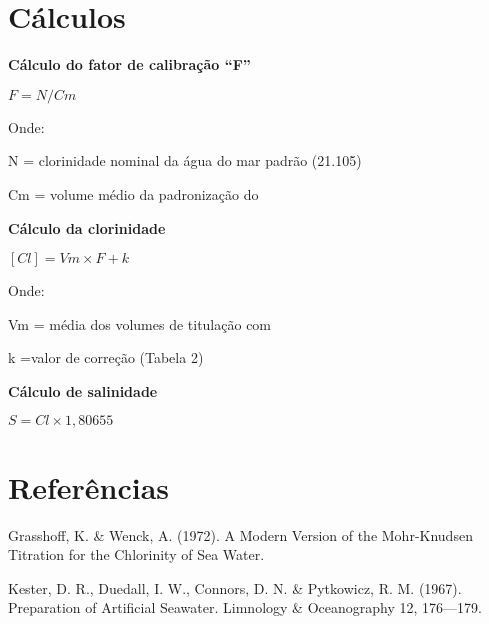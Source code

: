 \documentclass[a4paper,10pt]{SelfArx}
\begin{document}
\section{Cálculos}

\textbf {Cálculo do fator de calibração “F”}

\begin{center}
$F = N/Cm$
\end{center}

Onde:

N = clorinidade nominal da água do mar padrão (21.105)

Cm = volume médio da padronização do 

\vspace{0.20cm}
\noindent 
\textbf {Cálculo da clorinidade}

\begin{center}
$[Cl] = Vm \times F + k$
\end {center}
    
Onde:

Vm = média dos volumes de titulação com 

k =valor de correção (Tabela 2)
 
\vspace{0.20cm} 
\noindent 
\textbf {Cálculo de salinidade}

\begin{center}
$S = Cl \times 1,80655$
\end{center}

\section{Referências}
Grasshoff, K. \& Wenck, A. (1972). A Modern Version of the Mohr-Knudsen Titration for the Chlorinity of Sea Water.

Kester, D. R., Duedall, I. W., Connors, D. N. \& Pytkowicz, R. M. (1967). Preparation of Artificial Seawater. Limnology \& Oceanography 12, 176—179.


% 

\vfill
\end{document}
